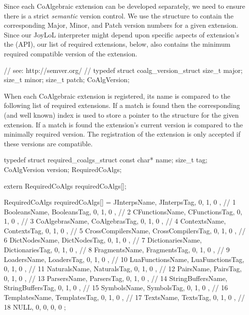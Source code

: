 Since each CoAlgebraic extension can be developed separately, we need to 
ensure there is a strict \emph{semantic} version control. We use the 
 structure to contain the corresponding Major, Minor, 
and Patch version numbers for a given extension. Since our JoyLoL 
interpreter might depend upon specific aspects of extension's the 
 (API), our list of required 
extensions, below, also contains the minimum required compatible version 
of the extension. 

\startCHeader
// see: http://semver.org/
//
typedef struct coalg_version_struct {
  size_t major;
  size_t minor;
  size_t patch;
} CoAlgVersion;
\stopCHeader

When each CoAlgebraic extension is registered, its name is compared to the 
following list of required extensions. If a match is found then the 
corresponding (and well known) index is used to store a pointer to the 
 structure for the given extension. If a match is found 
the extension's current version is compared to the minimally required 
version. The registration of the extension is only accepted if these 
versions are compatible. 

\startCHeader
typedef struct required_coalgs_struct {
  const char*  name;
  size_t       tag;
  CoAlgVersion version;
} RequiredCoAlgs;

extern RequiredCoAlgs requiredCoAlgs[];
\stopCHeader
{}

\startCCode
RequiredCoAlgs requiredCoAlgs[] = {
  { JInterpsName,       JInterpsTag,       {0, 1, 0 }}, //  1
  { BooleansName,       BooleansTag,       {0, 1, 0 }}, //  2
  { CFunctionsName,     CFunctionsTag,     {0, 1, 0 }}, //  3
  { CoAlgebrasName,     CoAlgebrasTag,     {0, 1, 0 }}, //  4
  { ContextsName,       ContextsTag,       {0, 1, 0 }}, //  5
  { CrossCompilersName, CrossCompilersTag, {0, 1, 0 }}, //  6
  { DictNodesName,      DictNodesTag,      {0, 1, 0 }}, //  7
  { DictionariesName,   DictionariesTag,   {0, 1, 0 }}, //  8
  { FragmentsName,      FragmentsTag,      {0, 1, 0 }}, //  9
  { LoadersName,        LoadersTag,        {0, 1, 0 }}, // 10
  { LuaFunctionsName,   LuaFunctionsTag,   {0, 1, 0 }}, // 11
  { NaturalsName,       NaturalsTag,       {0, 1, 0 }}, // 12
  { PairsName,          PairsTag,          {0, 1, 0 }}, // 13
  { ParsersName,        ParsersTag,        {0, 1, 0 }}, // 14
  { StringBuffersName,  StringBuffersTag,  {0, 1, 0 }}, // 15
  { SymbolsName,        SymbolsTag,        {0, 1, 0 }}, // 16
  { TemplatesName,      TemplatesTag,      {0, 1, 0 }}, // 17
  { TextsName,          TextsTag,          {0, 1, 0 }}, // 18
  { NULL,               0,                 {0, 0, 0 }}
};
\stopCCode

